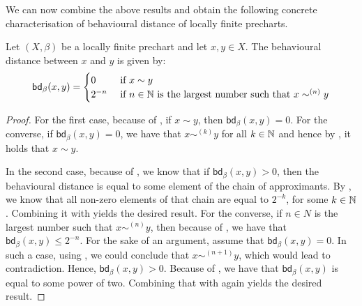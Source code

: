 We can now combine the above results and obtain the following concrete characterisation of behavioural distance of locally finite precharts.
\begin{theorem}\label{thm:concrete_distance}
Let $(X,\beta)$ be a locally finite prechart and let $x,y \in X$. The behavioural distance between $x$ and $y$ is given by:
	$$\mathsf{bd}_\beta(x,y) = \begin{cases}
		0 & \text{ if } x \sim y\\
		2^{-n} & \text{ if } n \in \mathbb{N} \text{ is the largest number such that } x\sim^{(n)} y
	\end{cases}$$
\end{theorem}
\begin{proof}
	For the first case, because of , if $x \sim y$, then $\mathsf{bd}_{\beta}(x,y)=0$. For the converse, if $\mathsf{bd}_{\beta}(x,y)=0$, we have that $x \sim^{(k)} y$ for all $k \in \mathbb{N}$ and hence by , it holds that $x \sim y$.
	
	 In the second case, because of , we know that if $\mathsf{bd}_\beta(x,y) > 0$, then the behavioural distance is equal to some element of the chain of approximants. By , we know that all non-zero elements of that chain are equal to $2^{-k}$, for some $k \in \mathbb{N}$. Combining it with  yields the desired result. 
	 For the converse, if $n \in N$ is the largest number such that $x \sim^{(n)} y$, then because of , we have that $\mathsf{bd}_\beta(x,y)\leq 2^{-n}$. For the sake of an argument, assume that $\mathsf{bd}_\beta(x,y)=0$. In such a case, using , we could conclude that $x \sim^{(n+1)} y$, which would lead to contradiction. Hence, $\mathsf{bd}_\beta(x,y)>0$. Because of , we have that $\mathsf{bd}_\beta(x,y)$ is equal to some power of two. Combining that with  again yields the desired result.

\end{proof}

